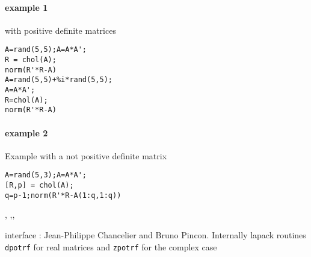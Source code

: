 \begin{examples}
\paragraph{example 1} with positive definite matrices 
\begin{Verbatim}
A=rand(5,5);A=A*A';
R = chol(A);
norm(R'*R-A)
A=rand(5,5)+%i*rand(5,5);
A=A*A';
R=chol(A);
norm(R'*R-A)
\end{Verbatim}

\paragraph{example 2} Example with a not positive definite matrix
\begin{Verbatim}
A=rand(5,3);A=A*A';
[R,p] = chol(A);
q=p-1;norm(R'*R-A(1:q,1:q))
\end{Verbatim}
\end{examples}

\begin{manseealso}
  , ,,   
\end{manseealso}

\begin{authors}
   interface : Jean-Philippe Chancelier and Bruno Pincon. Internally lapack routines \verb+dpotrf+ for real matrices 
   and \verb+zpotrf+ for the complex case
\end{authors}


 
 
  
